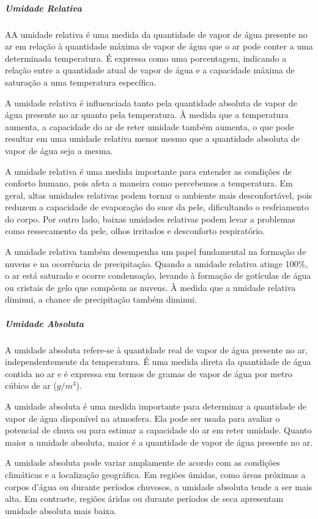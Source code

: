 \documentclass[a4paper, 12pt, onecolumn,singlespacing]{article}
\begin{document}
	\subparagraph{Umidade Relativa} AA umidade relativa é uma medida da quantidade de vapor de água presente no ar em relação à quantidade máxima de vapor de água que o ar pode conter a uma determinada temperatura. É expressa como uma porcentagem, indicando a relação entre a quantidade atual de vapor de água e a capacidade máxima de saturação a uma temperatura específica.
	
	A umidade relativa é influenciada tanto pela quantidade absoluta de vapor de água presente no ar quanto pela temperatura. À medida que a temperatura aumenta, a capacidade do ar de reter umidade também aumenta, o que pode resultar em uma umidade relativa menor mesmo que a quantidade absoluta de vapor de água seja a mesma.
	
	A umidade relativa é uma medida importante para entender as condições de conforto humano, pois afeta a maneira como percebemos a temperatura. Em geral, altas umidades relativas podem tornar o ambiente mais desconfortável, pois reduzem a capacidade de evaporação do suor da pele, dificultando o resfriamento do corpo. Por outro lado, baixas umidades relativas podem levar a problemas como ressecamento da pele, olhos irritados e desconforto respiratório.
	
	A umidade relativa também desempenha um papel fundamental na formação de nuvens e na ocorrência de precipitação. Quando a umidade relativa atinge 100\%, o ar está saturado e ocorre condensação, levando à formação de gotículas de água ou cristais de gelo que compõem as nuvens. À medida que a umidade relativa diminui, a chance de precipitação também diminui.
	
	\subparagraph{Umidade Absoluta}
	
	A umidade absoluta refere-se à quantidade real de vapor de água presente no ar, independentemente da temperatura. É uma medida direta da quantidade de água contida no ar e é expressa em termos de gramas de vapor de água por metro cúbico de ar ($g/m^3$).
	
	A umidade absoluta é uma medida importante para determinar a quantidade de vapor de água disponível na atmosfera. Ela pode ser usada para avaliar o potencial de chuva ou para estimar a capacidade do ar em reter umidade. Quanto maior a umidade absoluta, maior é a quantidade de vapor de água presente no ar.
	
	A umidade absoluta pode variar amplamente de acordo com as condições climáticas e a localização geográfica. Em regiões úmidas, como áreas próximas a corpos d'água ou durante períodos chuvosos, a umidade absoluta tende a ser mais alta. Em contraste, regiões áridas ou durante períodos de seca apresentam umidade absoluta mais baixa.
	
\end{document}
